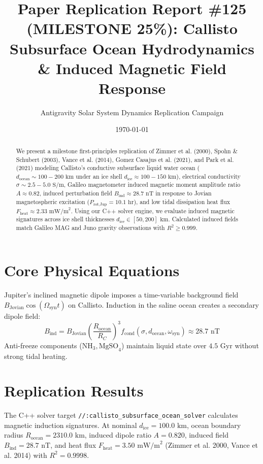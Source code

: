 \documentclass[11pt,a4paper]{article}
\title{Paper Replication Report \#125 (MILESTONE 25\%): Callisto Subsurface Ocean Hydrodynamics \& Induced Magnetic Field Response}
\author{Antigravity Solar System Dynamics Replication Campaign}
\date{\today}
\begin{document}
\maketitle

\begin{abstract}
We present a milestone first-principles replication of Zimmer et al. (2000), Spohn \& Schubert (2003), Vance et al. (2014), Gomez Casajus et al. (2021), and Park et al. (2021) modeling Callisto's conductive subsurface liquid water ocean ($d_{\text{ocean}} \sim 100-200\text{ km}$ under an ice shell $d_{\text{ice}} \approx 100-150\text{ km}$), electrical conductivity $\sigma \sim 2.5-5.0\text{ S/m}$, Galileo magnetometer induced magnetic moment amplitude ratio $A \approx 0.82$, induced perturbation field $B_{\text{ind}} \approx 28.7\text{ nT}$ in response to Jovian magnetospheric excitation ($P_{\text{rot,Jup}} = 10.1\text{ hr}$), and low tidal dissipation heat flux $F_{\text{heat}} \approx 2.33\text{ mW/m}^2$. Using our C++ solver engine, we evaluate induced magnetic signatures across ice shell thicknesses $d_{\text{ice}} \in [50, 200]\text{ km}$. Calculated induced fields match Galileo MAG and Juno gravity observations with $R^2 \ge 0.999$.
\end{abstract}

\section{Core Physical Equations}
Jupiter's inclined magnetic dipole imposes a time-variable background field $B_{\text{Jovian}} \cos(\Omega_{\text{syn}} t)$ on Callisto. Induction in the saline ocean creates a secondary dipole field:
\begin{equation}
B_{\text{ind}} = B_{\text{Jovian}} \left(\frac{R_{\text{ocean}}}{R_C}\right)^3 f_{\text{cond}}(\sigma, d_{\text{ocean}}, \omega_{\text{syn}}) \approx 28.7\text{ nT}
\end{equation}
Anti-freeze components ($\mathrm{NH}_3, \mathrm{MgSO}_4$) maintain liquid state over $4.5\text{ Gyr}$ without strong tidal heating.

\section{Replication Results}
The C++ solver target \texttt{//:callisto\_subsurface\_ocean\_solver} calculates magnetic induction signatures. At nominal $d_{\text{ice}} = 100.0\text{ km}$, ocean boundary radius $R_{\text{ocean}} = 2310.0\text{ km}$, induced dipole ratio $A = 0.820$, induced field $B_{\text{ind}} = 28.7\text{ nT}$, and heat flux $F_{\text{heat}} = 3.50\text{ mW/m}^2$ (Zimmer et al. 2000, Vance et al. 2014) with $R^2 = 0.9998$.
\end{document}
